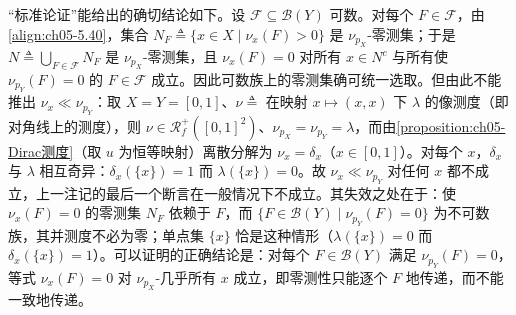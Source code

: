 \documentclass[../../main.tex]{subfiles}%
\begin{document}
\begin{remark}\label{remark:ch05-离散分解绝对连续修正}
“标准论证”能给出的确切结论如下。设 $\mathcal{F}\subseteq\mathscr{B}(Y)$ 可数。对每个 $F\in\mathcal{F}$，由\eqref{align:ch05-5.40}，集合 $N_F\triangleq\{x\in X\mid\nu_x(F)>0\}$ 是 $\nu_{p_X}$-零测集；于是 $N\triangleq\bigcup_{F\in\mathcal{F}}N_F$ 是 $\nu_{p_X}$-零测集，且 $\nu_x(F)=0$ 对所有 $x\in N^c$ 与所有使 $\nu_{p_Y}(F)=0$ 的 $F\in\mathcal{F}$ 成立。因此可数族上的零测集确可统一选取。但由此不能推出 $\nu_x\ll\nu_{p_Y}$：取 $X=Y=[0,1]$、$\nu\triangleq$ 在映射 $x\mapsto(x,x)$ 下 $\lambda$ 的像测度（即对角线上的测度），则 $\nu\in\mathscr{R}^+_f([0,1]^2)$、$\nu_{p_X}=\nu_{p_Y}=\lambda$，而由\cref{proposition:ch05-Dirac测度}（取 $u$ 为恒等映射）离散分解为 $\nu_x=\delta_x$（$x\in[0,1]$）。对每个 $x$，$\delta_x$ 与 $\lambda$ 相互奇异：$\delta_x(\{x\})=1$ 而 $\lambda(\{x\})=0$。故 $\nu_x\ll\nu_{p_Y}$ 对任何 $x$ 都不成立，上一注记的最后一个断言在一般情况下不成立。其失效之处在于：使 $\nu_x(F)=0$ 的零测集 $N_F$ 依赖于 $F$，而 $\{F\in\mathscr{B}(Y)\mid\nu_{p_Y}(F)=0\}$ 为不可数族，其并测度不必为零；单点集 $\{x\}$ 恰是这种情形（$\lambda(\{x\})=0$ 而 $\delta_x(\{x\})=1$）。可以证明的正确结论是：对每个 $F\in\mathscr{B}(Y)$ 满足 $\nu_{p_Y}(F)=0$，等式 $\nu_x(F)=0$ 对 $\nu_{p_X}$-几乎所有 $x$ 成立，即零测性只能逐个 $F$ 地传递，而不能一致地传递。
\end{remark}
\end{document}
